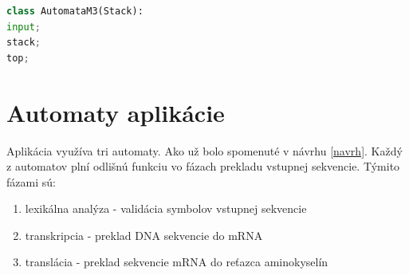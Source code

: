 \begin{lstlisting}[language=Python, caption=Premenné triedy \texttt{AutomataM3}]
class AutomataM3(Stack):
input;
stack;
top;
\end{lstlisting}

\section{Automaty aplikácie}
\label{automat}
Aplikácia využíva tri automaty. Ako už bolo spomenuté v návrhu \ref{navrh}. Každý z automatov plní odlišnú funkciu vo fázach prekladu vstupnej sekvencie. Týmito fázami sú:
\begin{enumerate}
\item lexikálna analýza - validácia symbolov vstupnej sekvencie
\item transkripcia - preklad DNA sekvencie do mRNA
\item translácia - preklad sekvencie mRNA do reťazca aminokyselín
\end{enumerate} 
